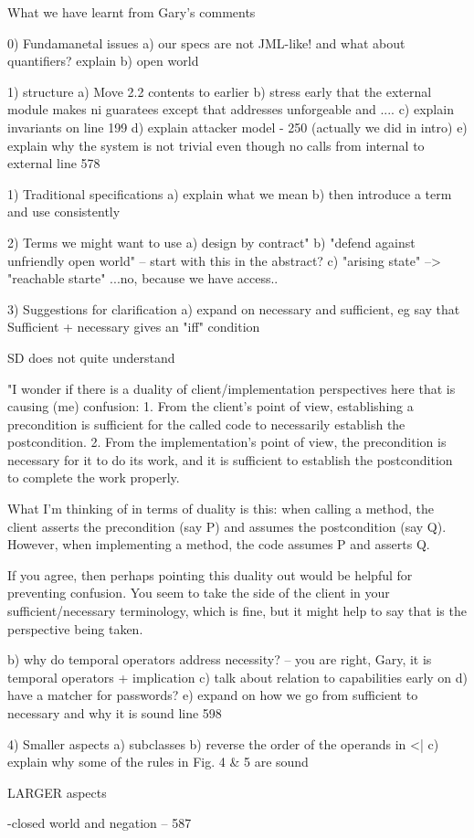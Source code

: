 

What we have learnt from Gary's comments


0) Fundamanetal issues
a) our specs are not JML-like! and what about quantifiers? explain
b) open world

1) structure
a) Move 2.2 contents to earlier
b) stress early that the external module makes ni guaratees except that addresses unforgeable and ....
c) explain invariants on line 199
d) explain attacker model - 250 (actually we did in intro)
e) explain why the system is not trivial even though no calls from internal to external line 578

1) Traditional specifications
a) explain what we mean
b) then introduce a term and use consistently

2) Terms we might want to use
a) design by contract"
b) "defend against unfriendly open world" -- start with this in the abstract?
c) "arising state" --> "reachable starte" ...no, because we have access..

3) Suggestions for clarification
a) expand on necessary and sufficient, eg say that Sufficient + necessary gives an "iff" condition

SD does not quite understand 

"I wonder if there is a duality of client/implementation perspectives here that is causing (me) confusion:
1. From the client's point of view, establishing a precondition is sufficient for the called code to necessarily establish the postcondition.
2. From the implementation's point of view, the precondition is necessary for it to do its work, and it is sufficient to establish the postcondition to complete the work properly.

What I'm thinking of in terms of duality is this: when calling a method, the client asserts the precondition (say P) and assumes the postcondition (say Q). However, when implementing a method, the code assumes P and asserts Q.

If you agree, then perhaps pointing this duality out would be helpful for preventing confusion.  You seem to take the side of the client in your sufficient/necessary terminology, which is fine, but it might help to say that is the perspective being taken.

b) why do temporal operators address necessity? -- you are right, Gary, it is temporal operators + implication
c) talk about relation to capabilities early on
d) have a matcher for passwords? 
e) expand on how we go from sufficient to necessary and why it is sound line 598



4) Smaller aspects
a) subclasses
b) reverse the order of the operands in <| 
c) explain why some of the rules in Fig. 4 & 5 are sound


LARGER aspects

-closed world and negation -- 587

